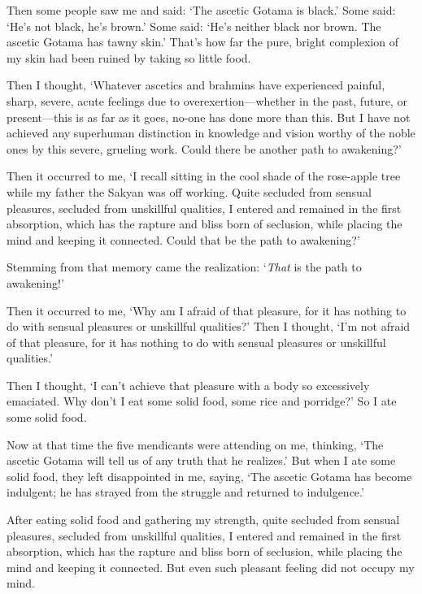 \documentclass[12pt,openany]{book}%
\begin{document}
Then some people saw me and said: ‘The ascetic Gotama is black.’ Some said: ‘He’s not black, he’s brown.’ Some said: ‘He’s neither black nor brown. The ascetic Gotama has tawny skin.’ That’s how far the pure, bright complexion of my skin had been ruined by taking so little food. 

Then I thought, ‘Whatever ascetics and brahmins have experienced painful, sharp, severe, acute feelings due to overexertion—whether in the past, future, or present—this is as far as it goes, no-one has done more than this. But I have not achieved any superhuman distinction in knowledge and vision worthy of the noble ones by this severe, grueling work. Could there be another path to awakening?’ 

Then it occurred to me, ‘I recall sitting in the cool shade of the rose-apple tree while my father the Sakyan was off working. Quite secluded from sensual pleasures, secluded from unskillful qualities, I entered and remained in the first absorption, which has the rapture and bliss born of seclusion, while placing the mind and keeping it connected. Could that be the path to awakening?’ 

Stemming from that memory came the realization: ‘\emph{That} is the path to awakening!’ 

Then it occurred to me, ‘Why am I afraid of that pleasure, for it has nothing to do with sensual pleasures or unskillful qualities?’ Then I thought, ‘I’m not afraid of that pleasure, for it has nothing to do with sensual pleasures or unskillful qualities.’ 

Then I thought, ‘I can’t achieve that pleasure with a body so excessively emaciated. Why don’t I eat some solid food, some rice and porridge?’ So I ate some solid food. 

Now at that time the five mendicants were attending on me, thinking, ‘The ascetic Gotama will tell us of any truth that he realizes.’ But when I ate some solid food, they left disappointed in me, saying, ‘The ascetic Gotama has become indulgent; he has strayed from the struggle and returned to indulgence.’ 

After eating solid food and gathering my strength, quite secluded from sensual pleasures, secluded from unskillful qualities, I entered and remained in the first absorption, which has the rapture and bliss born of seclusion, while placing the mind and keeping it connected. But even such pleasant feeling did not occupy my mind. 
\end{document}

